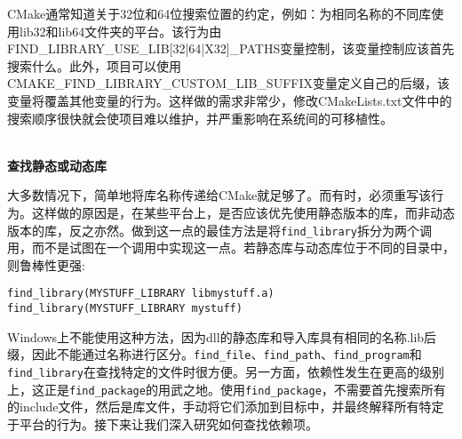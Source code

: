 CMake通常知道关于32位和64位搜索位置的约定，例如：为相同名称的不同库使用lib32和lib64文件夹的平台。该行为由FIND\_LIBRARY\_USE\_LIB[32|64|X32]\_PATHS变量控制，该变量控制应该首先搜索什么。此外，项目可以使用CMAKE\_FIND\_LIBRARY\_CUSTOM\_LIB\_SUFFIX变量定义自己的后缀，该变量将覆盖其他变量的行为。这样做的需求非常少，修改CMakeLists.txt文件中的搜索顺序很快就会使项目难以维护，并严重影响在系统间的可移植性。

\hspace*{\fill} \\ %
\noindent
\textbf{查找静态或动态库}

大多数情况下，简单地将库名称传递给CMake就足够了。而有时，必须重写该行为。这样做的原因是，在某些平台上，是否应该优先使用静态版本的库，而非动态版本的库，反之亦然。做到这一点的最佳方法是将\texttt{find\_library}拆分为两个调用，而不是试图在一个调用中实现这一点。若静态库与动态库位于不同的目录中，则鲁棒性更强:

\begin{lstlisting}[style=styleCMake]
find_library(MYSTUFF_LIBRARY libmystuff.a)
find_library(MYSTUFF_LIBRARY mystuff)
\end{lstlisting}

Windows上不能使用这种方法，因为dll的静态库和导入库具有相同的名称.lib后缀，因此不能通过名称进行区分。\texttt{find\_file}、\texttt{find\_path}、\texttt{find\_program}和\texttt{find\_library}在查找特定的文件时很方便。另一方面，依赖性发生在更高的级别上，这正是\texttt{find\_package}的用武之地。使用\texttt{find\_package}，不需要首先搜索所有的include文件，然后是库文件，手动将它们添加到目标中，并最终解释所有特定于平台的行为。接下来让我们深入研究如何查找依赖项。



